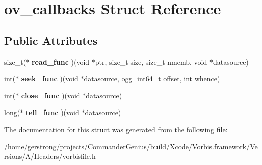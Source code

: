 \hypertarget{structov__callbacks}{
\section{ov\_\-callbacks Struct Reference}
\label{structov__callbacks}
}
\subsection*{Public Attributes}
\begin{DoxyCompactItemize}
\item 
\hypertarget{structov__callbacks_a5b4759c6cb3b398197c07bec4b5b6102}{
size\_\-t($\ast$ {\bfseries read\_\-func} )(void $\ast$ptr, size\_\-t size, size\_\-t nmemb, void $\ast$datasource)}
\label{structov__callbacks_a5b4759c6cb3b398197c07bec4b5b6102}

\item 
\hypertarget{structov__callbacks_a0fc2e2644a6e41931324bf2995c2de71}{
int($\ast$ {\bfseries seek\_\-func} )(void $\ast$datasource, ogg\_\-int64\_\-t offset, int whence)}
\label{structov__callbacks_a0fc2e2644a6e41931324bf2995c2de71}

\item 
\hypertarget{structov__callbacks_a7bc6240db657fc50e0e9b43d28ffbb49}{
int($\ast$ {\bfseries close\_\-func} )(void $\ast$datasource)}
\label{structov__callbacks_a7bc6240db657fc50e0e9b43d28ffbb49}

\item 
\hypertarget{structov__callbacks_ac5626dc0267fdc675353c4bb83cfb06f}{
long($\ast$ {\bfseries tell\_\-func} )(void $\ast$datasource)}
\label{structov__callbacks_ac5626dc0267fdc675353c4bb83cfb06f}

\end{DoxyCompactItemize}


The documentation for this struct was generated from the following file:\begin{DoxyCompactItemize}
\item 
/home/gerstrong/projects/CommanderGenius/build/Xcode/Vorbis.framework/Versions/A/Headers/vorbisfile.h\end{DoxyCompactItemize}
